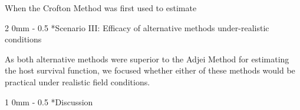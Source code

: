 \documentclass[12pt, a4paper]{article}
\makeatletter
\renewcommand{\section}{\@startsection
{section}%
{1}%
{0mm}%
{-\baselineskip}%
{0.5\baselineskip}%
{\normalfont\bf\large}} %
\renewcommand{\subsection}{\@startsection
{subsection}%
{2}%
{0mm}%
{-\baselineskip}%
{0.5\baselineskip}%
{\normalfont\bf}} %
\makeatother
\begin{document}
When the Crofton Method was first used to estimate

\subsection*{Scenario III: Efficacy of alternative methods under-realistic conditions}

As both alternative methods were superior to the Adjei Method for estimating the host survival function, we focused whether either of these methods would be practical under realistic field conditions.

\section*{Discussion}




\singlespacing


\end{document}
